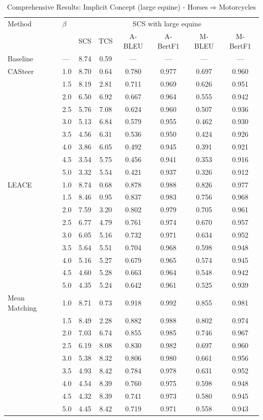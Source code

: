 \begin{table}[htbp]
\centering
\caption{Comprehensive Results: Implicit Concept (large equine) - Horses$\Rightarrow$Motorcycles}
\label{tab:implicitconcept_large_equine_horsestomotorcycles}
\begin{tabular}{l|l|cccccc|}
\hline
Method & $\beta$ & \multicolumn{6}{c|}{SCS with large equine} \\
 &  & SCS & TCS & A-BLEU & A-BertF1 & M-BLEU & M-BertF1 \\
\hline
Baseline & — & 8.74 & 0.59 & — & — & — & — \\
\hline
CASteer & 1.0 & 8.70 & 0.64 & 0.780 & 0.977 & 0.697 & 0.960 \\
 & 1.5 & 8.19 & 2.81 & 0.711 & 0.969 & 0.626 & 0.951 \\
 & 2.0 & 6.50 & 6.92 & 0.667 & 0.964 & 0.555 & 0.942 \\
 & 2.5 & 5.76 & 7.08 & 0.624 & 0.960 & 0.507 & 0.936 \\
 & 3.0 & 5.13 & 6.84 & 0.579 & 0.955 & 0.462 & 0.930 \\
 & 3.5 & 4.56 & 6.31 & 0.536 & 0.950 & 0.424 & 0.926 \\
 & 4.0 & 3.86 & 6.05 & 0.492 & 0.945 & 0.391 & 0.921 \\
 & 4.5 & 3.54 & 5.75 & 0.456 & 0.941 & 0.353 & 0.916 \\
 & 5.0 & 3.32 & 5.54 & 0.421 & 0.937 & 0.326 & 0.912 \\
\hline
LEACE & 1.0 & 8.74 & 0.68 & 0.878 & 0.988 & 0.826 & 0.977 \\
 & 1.5 & 8.46 & 0.95 & 0.837 & 0.983 & 0.756 & 0.968 \\
 & 2.0 & 7.59 & 3.20 & 0.802 & 0.979 & 0.705 & 0.961 \\
 & 2.5 & 6.77 & 4.79 & 0.761 & 0.974 & 0.670 & 0.957 \\
 & 3.0 & 6.05 & 5.16 & 0.732 & 0.971 & 0.634 & 0.952 \\
 & 3.5 & 5.64 & 5.51 & 0.704 & 0.968 & 0.598 & 0.948 \\
 & 4.0 & 5.16 & 5.27 & 0.679 & 0.965 & 0.574 & 0.945 \\
 & 4.5 & 4.60 & 5.28 & 0.663 & 0.964 & 0.548 & 0.942 \\
 & 5.0 & 4.35 & 5.24 & 0.642 & 0.961 & 0.525 & 0.939 \\
\hline
Mean Matching & 1.0 & 8.71 & 0.73 & 0.918 & 0.992 & 0.855 & 0.981 \\
 & 1.5 & 8.49 & 2.28 & 0.882 & 0.988 & 0.802 & 0.974 \\
 & 2.0 & 7.03 & 6.74 & 0.855 & 0.985 & 0.746 & 0.967 \\
 & 2.5 & 6.19 & 8.08 & 0.830 & 0.982 & 0.697 & 0.960 \\
 & 3.0 & 5.38 & 8.32 & 0.806 & 0.980 & 0.661 & 0.956 \\
 & 3.5 & 4.93 & 8.42 & 0.784 & 0.978 & 0.631 & 0.952 \\
 & 4.0 & 4.54 & 8.39 & 0.760 & 0.975 & 0.598 & 0.948 \\
 & 4.5 & 4.32 & 8.39 & 0.741 & 0.973 & 0.580 & 0.945 \\
 & 5.0 & 4.45 & 8.42 & 0.719 & 0.971 & 0.558 & 0.943 \\
\hline
\end{tabular}
\end{table}